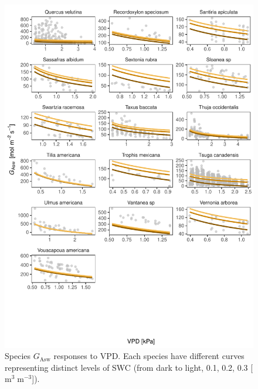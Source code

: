 \documentclass[11pt,twoside]{reedthesis}
\begin{document}
\begin{figure}[H]

{\centering \includegraphics[width=1\linewidth]{figure/appendixD/ggg7} 

}

\caption{Species $G_{\text{Asw}}$ responses to VPD. Each species have different curves representing distinct levels of SWC (from dark to light, 0.1, 0.2, 0.3 [$\text{m}^3\; \text{m}^{-3}$]).}\label{fig:unnamed-chunk-24}
\end{figure}
\end{document}
